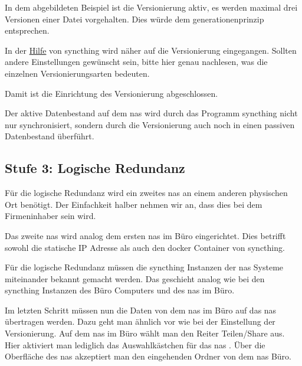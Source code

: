 
In dem abgebildeten Beispiel ist die Versionierung aktiv, es werden maximal
drei Versionen einer Datei vorgehalten. Dies würde dem \gls{generationenprinzip}
entsprechen.
\bigskip

In der \href{https://docs.syncthing.net/v1.29.7/users/versioning}{Hilfe} von
\gls{syncthing} wird näher auf die Versionierung eingegangen. Sollten andere
Einstellungen gewünscht sein, bitte hier genau nachlesen, was die einzelnen
Versionierungsarten bedeuten.


Damit ist die Einrichtung des Versionierung abgeschlossen.
\bigskip

 Der aktive Datenbestand auf dem \gls{nas} wird durch
das Programm \gls{syncthing} nicht nur synchronisiert, sondern durch die
Versionierung auch noch in einen passiven Datenbestand überführt.

\subsection{Stufe 3: Logische Redundanz}

Für die logische Redundanz wird ein zweites \gls{nas} an einem anderen
physischen Ort benötigt. Der Einfachkeit halber nehmen wir an, dass dies bei
dem Firmeninhaber  sein wird.
\bigskip

Das zweite \gls{nas}  wird analog dem ersten \gls{nas} im
Büro eingerichtet. Dies betrifft sowohl die statische IP Adresse als auch den
\gls{docker} Container von \gls{syncthing}.
\bigskip

Für die logische Redundanz müssen die \gls{syncthing} Instanzen der \gls{nas}
Systeme miteinander bekannt gemacht werden. Das geschieht analog wie bei
den \gls{syncthing} Instanzen des Büro Computers und des \gls{nas} im Büro.
\bigskip

Im letzten Schritt müssen nun die Daten von dem \gls{nas} im Büro auf das
\gls{nas}  übertragen werden. Dazu geht man ähnlich vor
wie bei der Einstellung der Versionierung. Auf dem \gls{nas} im Büro wählt man
den Reiter Teilen/Share aus. Hier aktiviert man lediglich das Auswahlkästchen
für das \gls{nas} . Über die Oberfläche des \gls{nas}
 akzeptiert man den eingehenden Ordner von dem \gls{nas}
Büro.

